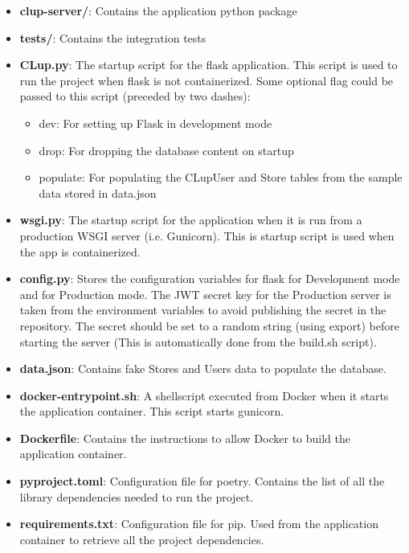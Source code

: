 \begin{itemize}
    \item \textbf{clup-server/}: Contains the application python package
    \item \textbf{tests/}: Contains the integration tests
    \item \textbf{CLup.py}: The startup script for the flask application. This script is used to run the project when flask is not containerized. Some optional flag could be passed to this script (preceded by two dashes):
          \begin{itemize}
              \item dev:  For setting up Flask in development mode
              \item drop: For dropping the database content on startup
              \item populate: For populating the CLupUser and Store tables from the sample data stored in data.json
          \end{itemize}
    \item \textbf{wsgi.py}: The startup script for the application when it is run from a production WSGI server (i.e. Gunicorn). This is startup script is used when the app is containerized.
    \item \textbf{config.py}: Stores the configuration variables for flask for Development mode and for Production mode. The JWT secret key for the Production server is taken from the environment variables to avoid publishing the secret in the repository. The secret should be set to a random string (using export) before starting the server (This is automatically done from the build.sh script).
    \item \textbf{data.json}: Contains fake Stores and Users data to populate the database.
    \item \textbf{docker-entrypoint.sh}: A shellscript executed from Docker when it starts the application container. This script starts gunicorn.
    \item \textbf{Dockerfile}: Contains the instructions to allow Docker to build the application container.
    \item \textbf{pyproject.toml}: Configuration file for poetry. Contains the list of all the library dependencies needed to run the project.
    \item \textbf{requirements.txt}: Configuration file for pip. Used from the application container to retrieve all the project dependencies.
\end{itemize}

